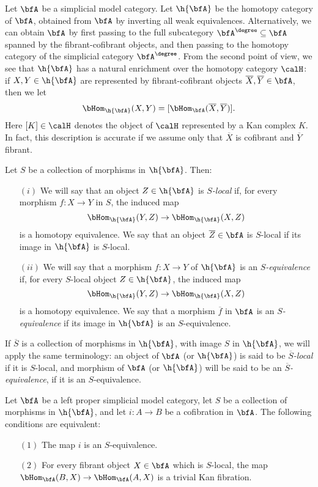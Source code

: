 \begin{Simplicial Categories}
Let $\bfA$ be a simplicial model category. Let $\h{\bfA}$ be the homotopy category of $\bfA$, obtained from $\bfA$ by inverting all weak equivalences. Alternatively, we can obtain $\bfA$ by first passing to the full subcategory $\bfA^{\degree} \subseteq \bfA$ spanned by the fibrant-cofibrant objects, and then passing to the homotopy category of the simplicial category $\bfA^{\degree}$. From the second point of view, we see that $\h{\bfA}$ has a natural enrichment over the homotopy category $\calH$: if $X, Y \in \h{\bfA}$ are represented by fibrant-cofibrant objects
$\overline{X}, \overline{Y} \in \bfA$, then we let
$$ \bHom_{ \h{\bfA}}(X,Y) = [ \bHom_{\bfA}(\overline{X}, \overline{Y}) ].$$
Here $[K] \in \calH$ denotes the object of $\calH$ represented by a Kan complex $K$. In fact, this description is accurate if we assume only that $\overline{X}$ is cofibrant and $\overline{Y}$ fibrant.

Let $S$ be a collection of morphisms in $\h{\bfA}$. Then:
\begin{itemize}
\item[$(i)$] We will say that an object $Z \in \h{\bfA}$ is 
{\it $S$-local} if, for every morphism $f: X \rightarrow Y$ in $S$, the induced map
$$ \bHom_{\h{\bfA}}( Y, Z) \rightarrow \bHom_{\h{\bfA}}( X, Z)$$ is a homotopy equivalence. We say that an object $\overline{Z} \in \bfA$ is $S$-local if its image in
$\h{\bfA}$ is $S$-local.
\item[$(ii)$] We will say that a morphism $f: X \rightarrow Y$ of $\h{\bfA}$ is an {\it $S$-equivalence} if, for every $S$-local object $Z \in \h{\bfA}$, the induced map
$$ \bHom_{\h{\bfA}}( Y, Z) \rightarrow \bHom_{\h{\bfA}}( X, Z)$$ is a homotopy equivalence. We say that a morphism $\overline{f}$ in $\bfA$ is an {\it $S$-equivalence} if its image in $\h{\bfA}$ is an $S$-equivalence.
\end{itemize}
If $\overline{S}$ is a collection of morphisms in $\h{\bfA}$, with image $S$ in $\h{\bfA}$, we will apply the same terminology: an object of $\bfA$ (or $\h{\bfA}$) is said to be {\it $\overline{S}$-local} if it is $S$-local, and morphism of $\bfA$ (or $\h{\bfA}$) will be said to be an {\it $\overline{S}$-equivalence}, if it is an $S$-equivalence.

\begin{lemma}\label{mtomp}
Let $\bfA$ be a left proper simplicial model category, let $S$ be a collection of morphisms
in $\h{\bfA}$, and let $i: A \rightarrow B$ be a cofibration in $\bfA$. The following conditions are equivalent:
\begin{itemize}
\item[$(1)$] The map $i$ is an $S$-equivalence.
\item[$(2)$] For every fibrant object $X \in \bfA$ which is $S$-local, the map
$\bHom_{\bfA}(B, X) \rightarrow \bHom_{\bfA}(A,X)$ is a trivial Kan fibration.
\end{itemize}
\end{lemma}


\end{Simplicial Categories}
